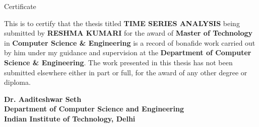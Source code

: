 \begin{center}
\LARGE{ Certificate} 
\end{center}

\vspace{0.5in}

This is to certify that the thesis titled {\bfseries TIME SERIES ANALYSIS} being submitted by
{\bfseries RESHMA KUMARI} for the award of {\bfseries Master of Technology} in {\bfseries Computer Science \& Engineering} is a record of bonafide work carried out by him under my guidance and supervision at the {\bfseries Department of Computer Science \& Engineering}. The work presented in this thesis has not been submitted elsewhere either in part or full, for the award of any other degree or diploma.

\vspace{1.5in}


{\bfseries Dr. Aaditeshwar Seth} \\
{\bfseries Department of Computer Science and Engineering} \\
{\bfseries Indian Institute of Technology, Delhi}\\ 
